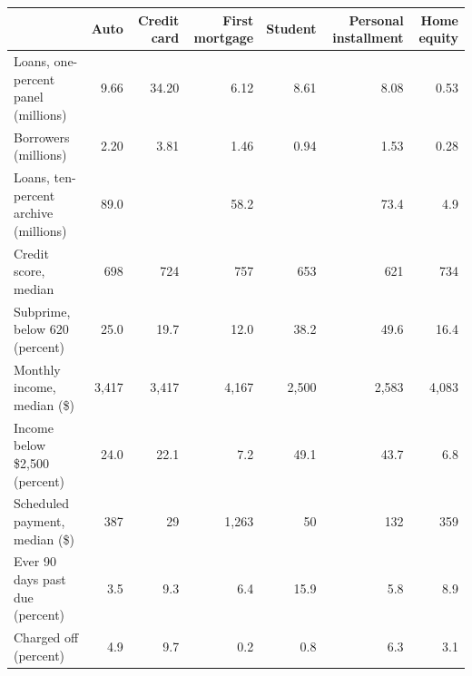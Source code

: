 \begin{tabular}{lrrrrrr}
\toprule
 & Auto & Credit card & First mortgage & Student & Personal installment & Home equity \\
\midrule
Loans, one-percent panel (millions) & 9.66 & 34.20 & 6.12 & 8.61 & 8.08 & 0.53 \\
Borrowers (millions) & 2.20 & 3.81 & 1.46 & 0.94 & 1.53 & 0.28 \\
Loans, ten-percent archive (millions) & 89.0 &  & 58.2 &  & 73.4 & 4.9 \\
Credit score, median & 698 & 724 & 757 & 653 & 621 & 734 \\
Subprime, below 620 (percent) & 25.0 & 19.7 & 12.0 & 38.2 & 49.6 & 16.4 \\
Monthly income, median (\$) & 3,417 & 3,417 & 4,167 & 2,500 & 2,583 & 4,083 \\
Income below \$2,500 (percent) & 24.0 & 22.1 & 7.2 & 49.1 & 43.7 & 6.8 \\
Scheduled payment, median (\$) &   387 &    29 & 1,263 &    50 &   132 &   359 \\
Ever 90 days past due (percent) & 3.5 & 9.3 & 6.4 & 15.9 & 5.8 & 8.9 \\
Charged off (percent) & 4.9 & 9.7 & 0.2 & 0.8 & 6.3 & 3.1 \\
\bottomrule
\end{tabular}
